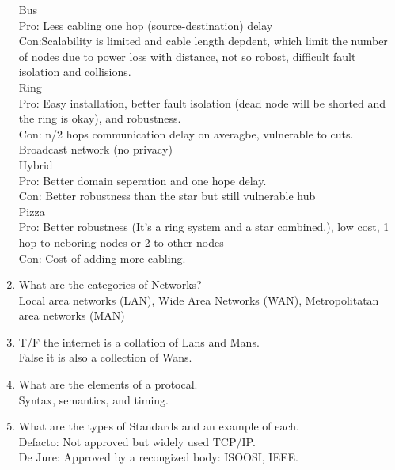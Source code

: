 \begin{enumerate}
          Bus\\
          Pro: Less cabling one hop (source-destination) delay\\
          Con:Scalability is limited and cable length depdent, which limit the number of nodes due to power loss with distance, not so robost, difficult fault isolation and collisions.\\

          Ring\\
          Pro: Easy installation, better fault isolation (dead node will be shorted and the ring is okay), and robustness.\\
          Con: n/2 hops communication delay on averagbe, vulnerable to cuts. Broadcast network (no privacy)\\

          Hybrid\\
          Pro: Better domain seperation and one hope delay.\\
          Con: Better robustness than the star but still vulnerable hub\\

          Pizza\\
          Pro: Better robustness (It's a ring system and a star combined.), low cost, 1 hop to neboring nodes or 2 to other nodes\\
          Con: Cost of adding more cabling.\\


    \item What are the categories of Networks?\\
          Local area networks (LAN), Wide Area Networks (WAN), Metropolitatan area networks (MAN)\\

    \item T/F the internet is a collation of Lans and Mans.\\
          False it is also a collection of Wans.\\

    \item What are the elements of a protocal.\\
          Syntax, semantics, and timing.\\

    \item What are the types of Standards and an example of each.\\
          Defacto: Not approved but widely used TCP/IP.\\
          De Jure: Approved by a recongized body: ISOOSI, IEEE.\\


\end{enumerate}
